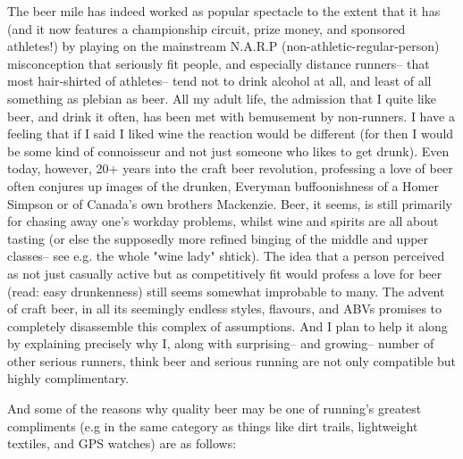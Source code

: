 The beer mile has indeed worked as popular spectacle to the extent that it has (and it now features a championship circuit, prize money, and sponsored athletes!) by playing on the mainstream N.A.R.P (non-athletic-regular-person) misconception that seriously fit people, and especially distance runners-- that most hair-shirted of athletes-- tend not to drink alcohol at all, and least of all something as plebian as beer. All my adult life, the admission that I quite like beer, and drink it often, has been met with bemusement by non-runners. I have a feeling that if I said I liked wine the reaction would be different (for then I would be some kind of connoisseur and not just someone who likes to get drunk). Even today, however, 20+ years into the craft beer revolution, professing a love of beer often conjures up images of the drunken, Everyman buffoonishness of a Homer Simpson or of Canada's own brothers Mackenzie. Beer, it seems, is still primarily for chasing away one's workday problems, whilst wine and spirits are all about tasting (or else the supposedly more refined binging of the middle and upper classes-- see e.g. the whole "wine lady" shtick). The idea that a person perceived as not just casually active but as competitively fit would profess a love for beer (read: easy drunkenness) still seems somewhat improbable to many. The advent of craft beer, in all its seemingly endless styles, flavours, and ABVs promises to completely disassemble this complex of assumptions. And I plan to help it along by explaining precisely why I, along with surprising-- and growing-- number of other serious runners, think beer and serious running are not only compatible but highly complimentary.

And some of the reasons why quality beer may be one of running's greatest compliments (e.g in the same category as things like dirt trails, lightweight textiles, and GPS watches) are as follows:

